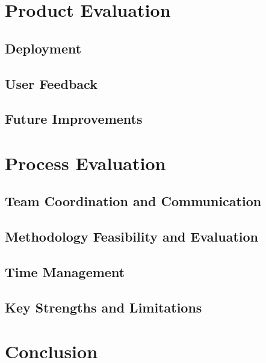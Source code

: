 \documentclass{article}
\begin{document}
\section{Product Evaluation}

    \subsection{Deployment}

    \subsection{User Feedback}

    \subsection{Future Improvements}

\section{Process Evaluation}

    \subsection{Team Coordination and Communication}

    \subsection{Methodology Feasibility and Evaluation}

    \subsection{Time Management}

    \subsection{Key Strengths and Limitations}

\section{Conclusion}
\end{document}
